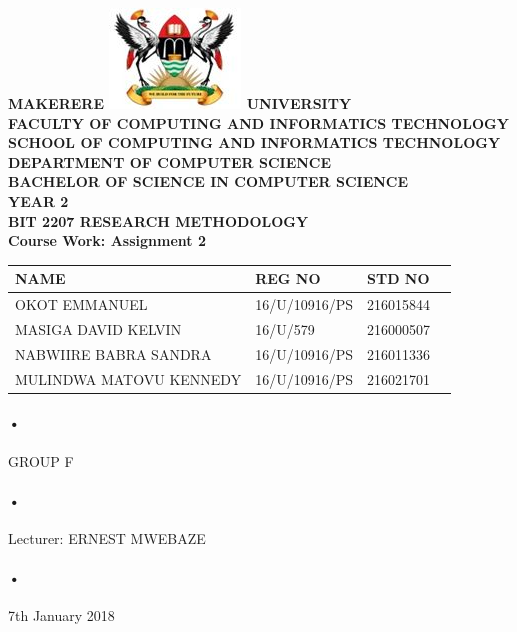\documentclass[12pt]{article}
\begin{document}
\begin{Huge}
\begin{center}
\begin{normalsize}
\textbf{MAKERERE \includegraphics[scale=0.5]{logo} UNIVERSITY }\\


\textbf{FACULTY OF COMPUTING AND INFORMATICS TECHNOLOGY} \\
\textbf{SCHOOL OF COMPUTING AND INFORMATICS TECHNOLOGY} \\
\textbf{DEPARTMENT OF COMPUTER SCIENCE} \\
\textbf{BACHELOR OF SCIENCE IN COMPUTER SCIENCE} \\
\textbf{YEAR 2} \\
\textbf{BIT 2207 RESEARCH METHODOLOGY} \\
\textbf{Course Work: Assignment 2}\\
\end{normalsize}
\end{center}
\end{Huge}

\begin{center}
\begin{tabular}{|l|l|l|c|}
\hline NAME  & REG NO & STD NO \\\hline
OKOT EMMANUEL& 16/U/10916/PS & 216015844 \\\hline
MASIGA DAVID KELVIN& 16/U/579 & 216000507 \\\hline
NABWIIRE BABRA SANDRA& 16/U/10916/PS & 216011336 \\\hline
MULINDWA MATOVU KENNEDY& 16/U/10916/PS & 216021701 \\\hline
\end{tabular}
\paragraph{•}
GROUP F\\
\paragraph{•}
Lecturer: ERNEST MWEBAZE \\
\paragraph{•}
7th January 2018

\end{center}
\end{document}
